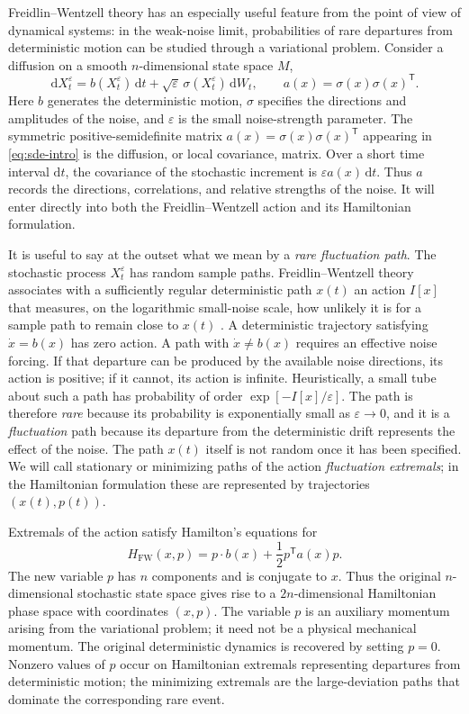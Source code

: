 \documentclass[11pt]{article}
\theoremstyle{definition}
\theoremstyle{remark}
\newcommand{\Hs}{H_{\mathrm{FW}}}
\newcommand{\eps}{\varepsilon}
\newcommand{\dd}{\mathrm{d}}
\newcommand{\cT}{\mathsf{T}}
\begin{document}
Freidlin--Wentzell theory \cite{FreidlinWentzell2012} has an especially useful feature from the point of view of dynamical systems: in the weak-noise limit, probabilities of rare departures from deterministic motion can be studied through a variational problem.  Consider a diffusion on a smooth $n$-dimensional state space $M$,
\begin{equation}
\dd X_t^\eps=b(X_t^\eps)\,\dd t+\sqrt{\eps}\,\sigma(X_t^\eps)\,\dd W_t,
\qquad a(x)=\sigma(x)\sigma(x)^{\cT}.
\label{eq:sde-intro}
\end{equation}
Here $b$ generates the deterministic motion, $\sigma$ specifies the directions and amplitudes of the noise, and $\eps$ is the small noise-strength parameter.  The symmetric positive-semidefinite matrix $a(x)=\sigma(x)\sigma(x)^{\cT}$ appearing in \eqref{eq:sde-intro} is the diffusion, or local covariance, matrix.  Over a short time interval $\dd t$, the covariance of the stochastic increment is $\eps a(x)\,\dd t$.  Thus $a$ records the directions, correlations, and relative strengths of the noise.  It will enter directly into both the Freidlin--Wentzell action and its Hamiltonian formulation.

It is useful to say at the outset what we mean by a \emph{rare fluctuation path}.  The stochastic process $X_t^\eps$ has random sample paths.  Freidlin--Wentzell theory associates with a sufficiently regular deterministic path $x(t)$ an action $I[x]$ that measures, on the logarithmic small-noise scale, how unlikely it is for a sample path to remain close to $x(t)$ \cite{FreidlinWentzell2012}.  A deterministic trajectory satisfying $\dot x=b(x)$ has zero action.  A path with $\dot x\ne b(x)$ requires an effective noise forcing.  If that departure can be produced by the available noise directions, its action is positive; if it cannot, its action is infinite.  Heuristically, a small tube about such a path has probability of order $\exp[-I[x]/\eps]$.  The path is therefore \emph{rare} because its probability is exponentially small as $\eps\to0$, and it is a \emph{fluctuation} path because its departure from the deterministic drift represents the effect of the noise.  The path $x(t)$ itself is not random once it has been specified.  We will call stationary or minimizing paths of the action \emph{fluctuation extremals}; in the Hamiltonian formulation these are represented by trajectories $(x(t),p(t))$.

Extremals of the action satisfy Hamilton's equations for
\begin{equation}
\Hs(x,p)=p\cdot b(x)+\frac12 p^{\cT}a(x)p.
\label{eq:fw-hamiltonian-intro}
\end{equation}
The new variable $p$ has $n$ components and is conjugate to $x$.  Thus the original $n$-dimensional stochastic state space gives rise to a $2n$-dimensional Hamiltonian phase space with coordinates $(x,p)$.  The variable $p$ is an auxiliary momentum arising from the variational problem; it need not be a physical mechanical momentum.  The original deterministic dynamics is recovered by setting $p=0$.  Nonzero values of $p$ occur on Hamiltonian extremals representing departures from deterministic motion; the minimizing extremals are the large-deviation paths that dominate the corresponding rare event.
\end{document}
